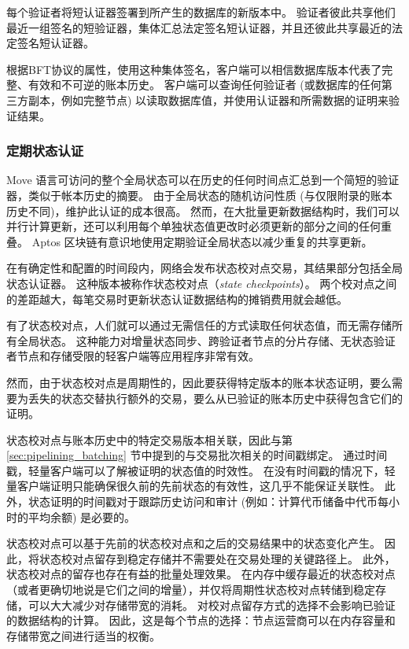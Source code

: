 \documentclass{article}
\begin{document}
每个验证者将短认证器签署到所产生的数据库的新版本中。 验证者彼此共享他们最近一组签名的短验证器，集体汇总法定签名短认证器，并且还彼此共享最近的法定签名短认证器。

根据BFT协议的属性，使用这种集体签名，客户端可以相信数据库版本代表了完整、有效和不可逆的账本历史。 客户端可以查询任何验证者 (或数据库的任何第三方副本，例如完整节点) 以读取数据库值，并使用认证器和所需数据的证明来验证结果。


\subsubsection{定期状态认证}
\label{subsubsec:period_state_certification}

Move 语言可访问的整个全局状态可以在历史的任何时间点汇总到一个简短的验证器，类似于帐本历史的摘要。 由于全局状态的随机访问性质 (与仅限附录的账本历史不同)，维护此认证的成本很高。 然而，在大批量更新数据结构时，我们可以并行计算更新，还可以利用每个单独状态值更改时必须更新的部分之间的任何重叠。 Aptos 区块链有意识地使用定期验证全局状态以减少重复的共享更新。

在有确定性和配置的时间段内，网络会发布状态校对点交易，其结果部分包括全局状态认证器。 这种版本被称作状态校对点（\emph{state checkpoints}）。 两个校对点之间的差距越大，每笔交易时更新状态认证数据结构的摊销费用就会越低。

有了状态校对点，人们就可以通过无需信任的方式读取任何状态值，而无需存储所有全局状态。 这种能力对增量状态同步、跨验证者节点的分片存储、无状态验证者节点和存储受限的轻客户端等应用程序非常有效。

然而，由于状态校对点是周期性的，因此要获得特定版本的账本状态证明，要么需要为丢失的状态交替执行额外的交易，要么从已验证的账本历史中获得包含它们的证明。

状态校对点与账本历史中的特定交易版本相关联，因此与第 \ref{sec:pipelining_batching} 节中提到的与交易批次相关的时间戳绑定。 通过时间戳，轻量客户端可以了解被证明的状态值的时效性。 在没有时间戳的情况下，轻量客户端证明只能确保很久前的先前状态的有效性，这几乎不能保证关联性。 此外，状态证明的时间戳对于跟踪历史访问和审计 (例如：计算代币储备中代币每小时的平均余额) 是必要的。

状态校对点可以基于先前的状态校对点和之后的交易结果中的状态变化产生。 因此，将状态校对点留存到稳定存储并不需要处在交易处理的关键路径上。 此外，状态校对点的留存也存在有益的批量处理效果。 在内存中缓存最近的状态校对点（或者更确切地说是它们之间的增量），并仅将周期性状态校对点转储到稳定存储，可以大大减少对存储带宽的消耗。 对校对点留存方式的选择不会影响已验证的数据结构的计算。 因此，这是每个节点的选择：节点运营商可以在内存容量和存储带宽之间进行适当的权衡。
\end{document}
